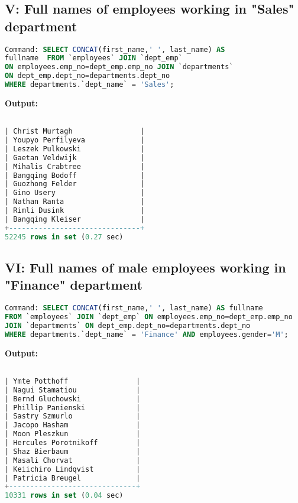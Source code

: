 \documentclass[12pt]{report}
\begin{document}
\subsection*{V: Full names of employees working in "Sales" department}

\begin{lstlisting}[language=sql]
Command: SELECT CONCAT(first_name,' ', last_name) AS 
fullname  FROM `employees` JOIN `dept_emp` 
ON employees.emp_no=dept_emp.emp_no JOIN `departments` 
ON dept_emp.dept_no=departments.dept_no 
WHERE departments.`dept_name` = 'Sales';
\end{lstlisting}
\textbf{Output:}

\begin{lstlisting}[language=sql]

| Christ Murtagh                |
| Youpyo Perfilyeva             |
| Leszek Pulkowski              |
| Gaetan Veldwijk               |
| Mihalis Crabtree              |
| Bangqing Bodoff               |
| Guozhong Felder               |
| Gino Usery                    |
| Nathan Ranta                  |
| Rimli Dusink                  |
| Bangqing Kleiser              |
+-------------------------------+
52245 rows in set (0.27 sec)


\end{lstlisting}



\subsection*{VI: Full names of male employees working in "Finance" department}

\begin{lstlisting}[language=sql]
Command: SELECT CONCAT(first_name,' ', last_name) AS fullname  
FROM `employees` JOIN `dept_emp` ON employees.emp_no=dept_emp.emp_no 
JOIN `departments` ON dept_emp.dept_no=departments.dept_no 
WHERE departments.`dept_name` = 'Finance' AND employees.gender='M';
\end{lstlisting}
\textbf{Output:}
\begin{lstlisting}[language=sql]

| Ymte Potthoff                |
| Nagui Stamatiou              |
| Bernd Gluchowski             |
| Phillip Panienski            |
| Sastry Szmurlo               |
| Jacopo Hasham                |
| Moon Pleszkun                |
| Hercules Porotnikoff         |
| Shaz Bierbaum                |
| Masali Chorvat               |
| Keiichiro Lindqvist          |
| Patricia Breugel             |
+------------------------------+
10331 rows in set (0.04 sec)
\end{lstlisting}
\end{document}
